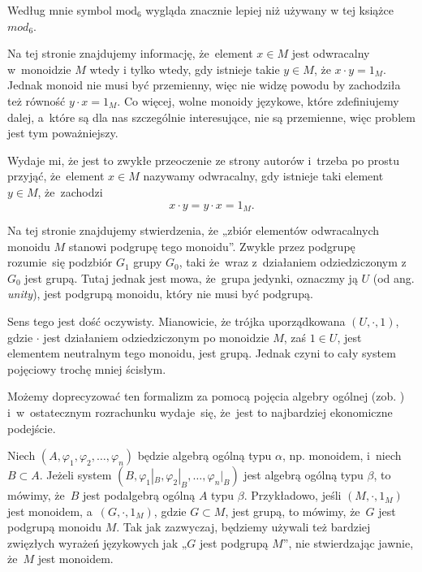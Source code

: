 \documentclass[a4paper,11pt]{article}
\begin{document}
\start {} Według mnie symbol $\textrm{mod}_{ 6 }$ wygląda
znacznie lepiej niż używany w tej książce $mod_{ 6 }$.

\vspace{\spaceFour}





\start {} Na tej stronie znajdujemy informację, że~element
$x \in M$ jest odwracalny w~monoidzie $M$ wtedy i tylko wtedy, gdy
istnieje takie $y \in M$, że $x \cdot y = 1_{ M }$. Jednak monoid nie
musi być przemienny, więc nie widzę powodu by zachodziła też równość
$y \cdot x = 1_{ M }$. Co więcej, wolne monoidy językowe, które
zdefiniujemy dalej, a~które są dla nas szczególnie interesujące, nie
są przemienne, więc problem jest tym poważniejszy.

Wydaje mi, że jest to zwykłe przeoczenie ze strony autorów i~trzeba po
prostu przyjąć, że~element $x \in M$ nazywamy odwracalny, gdy istnieje
taki element $y \in M$, że~zachodzi
\begin{equation}
  \label{eq:Forys-Forys-01}
  x \cdot y = y \cdot x = 1_{ M }.
\end{equation}

\vspace{\spaceFour}





\start {} Na tej stronie znajdujemy stwierdzenia, że „zbiór
elementów odwracalnych monoidu $M$ stanowi podgrupę tego monoidu”.
Zwykle przez podgrupę rozumie~się podzbiór $G_{ 1 }$ grupy $G_{ 0 }$,
taki że~wraz z~działaniem odziedziczonym z~$G_{ 0 }$ jest grupą. Tutaj
jednak jest mowa, że~grupa jedynki, oznaczmy ją $U$ (od ang.
\textit{unity}), jest podgrupą monoidu, który nie musi być podgrupą.

Sens tego jest dość oczywisty. Mianowicie, że trójka uporządkowana
$( U, \cdot, 1 )$, gdzie $\cdot$ jest działaniem odziedziczonym po
monoidzie $M$, zaś $1 \in U$, jest elementem neutralnym tego monoidu,
jest grupą. Jednak czyni to cały system pojęciowy trochę mniej
ścisłym.

Możemy doprecyzować ten formalizm za pomocą pojęcia algebry
ogólnej (zob. \cite{BialynickiBirulaZarysAlgebry1987}) i~w~ostatecznym
rozrachunku wydaje~się, że~jest to najbardziej ekonomiczne podejście.

Niech $( A, \varphi_{ 1 }, \varphi_{ 2 }, \ldots, \varphi_{ n } )$ będzie algebrą ogólną typu $\alpha$, np.
monoidem, i~niech $B \subset A$. Jeżeli system
$( B, \varphi_{ 1 }|_{ B }, \varphi_{ 2 }|_{ B }, \ldots, \varphi_{ n }|_{ B } )$ jest algebrą ogólną
typu $\beta$, to mówimy, że~$B$ jest podalgebrą ogólną $A$ typu $\beta$.
Przykładowo, jeśli $( M, \cdot, 1_{ M } )$ jest monoidem, a~$( G, \cdot, 1_{ M } )$,
gdzie $G \subset M$, jest grupą, to mówimy, że~$G$ jest podgrupą monoidu $M$. Tak
jak zazwyczaj, będziemy używali też bardziej zwięzłych wyrażeń językowych
jak „$G$ jest podgrupą $M$”, nie stwierdzając jawnie, że~$M$ jest monoidem.
\end{document}

